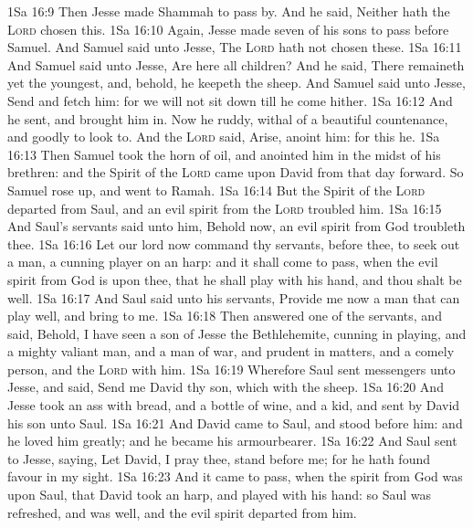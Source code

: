 \vs 1Sa 16:9 Then Jesse made Shammah to pass by. And he said, Neither hath the \textsc{Lord} chosen this.
\vs 1Sa 16:10 Again, Jesse made seven of his sons to pass before Samuel. And Samuel said unto Jesse, The \textsc{Lord} hath not chosen these.
\vs 1Sa 16:11 And Samuel said unto Jesse, Are here all  children? And he said, There remaineth yet the youngest, and, behold, he keepeth the sheep. And Samuel said unto Jesse, Send and fetch him: for we will not sit down till he come hither.
\vs 1Sa 16:12 And he sent, and brought him in. Now he  ruddy,  withal of a beautiful countenance, and goodly to look to. And the \textsc{Lord} said, Arise, anoint him: for this  he.
\vs 1Sa 16:13 Then Samuel took the horn of oil, and anointed him in the midst of his brethren: and the Spirit of the \textsc{Lord} came upon David from that day forward. So Samuel rose up, and went to Ramah.
\vs 1Sa 16:14 But the Spirit of the \textsc{Lord} departed from Saul, and an evil spirit from the \textsc{Lord} troubled him.
\vs 1Sa 16:15 And Saul's servants said unto him, Behold now, an evil spirit from God troubleth thee.
\vs 1Sa 16:16 Let our lord now command thy servants,  before thee, to seek out a man,  a cunning player on an harp: and it shall come to pass, when the evil spirit from God is upon thee, that he shall play with his hand, and thou shalt be well.
\vs 1Sa 16:17 And Saul said unto his servants, Provide me now a man that can play well, and bring  to me.
\vs 1Sa 16:18 Then answered one of the servants, and said, Behold, I have seen a son of Jesse the Bethlehemite,  cunning in playing, and a mighty valiant man, and a man of war, and prudent in matters, and a comely person, and the \textsc{Lord}  with him.
\vs 1Sa 16:19 Wherefore Saul sent messengers unto Jesse, and said, Send me David thy son, which  with the sheep.
\vs 1Sa 16:20 And Jesse took an ass  with bread, and a bottle of wine, and a kid, and sent  by David his son unto Saul.
\vs 1Sa 16:21 And David came to Saul, and stood before him: and he loved him greatly; and he became his armourbearer.
\vs 1Sa 16:22 And Saul sent to Jesse, saying, Let David, I pray thee, stand before me; for he hath found favour in my sight.
\vs 1Sa 16:23 And it came to pass, when the  spirit from God was upon Saul, that David took an harp, and played with his hand: so Saul was refreshed, and was well, and the evil spirit departed from him.
